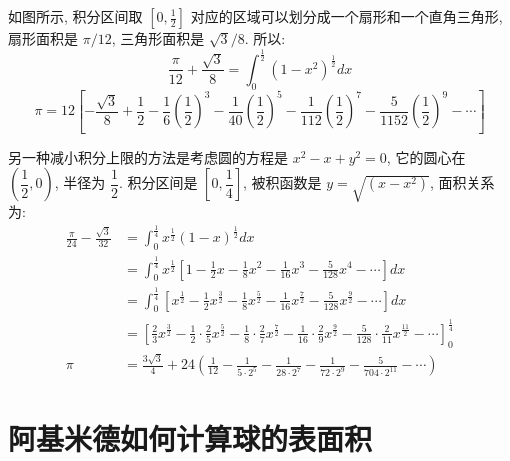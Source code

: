 如图所示, 积分区间取 $ [0, \frac{1}{2} ] $ 对应的区域可以划分成一个扇形和一个直角三角形, 扇形面积是 $ \pi/12 $, 三角形面积是 $ \sqrt{3}/8 $. 所以:
\[
\frac{\pi}{12}+\frac{\sqrt{3}}{8} = \int_0^\frac{1}{2}{(1-x^2)^\frac{1}{2} dx} 
\]
\[
\pi = 12\left[ -\frac{\sqrt{3}}{8} + \frac{1}{2}-\frac{1}{6}(\frac{1}{2})^3-\frac{1}{40}(\frac{1}{2})^5 - \frac{1}{112}(\frac{1}{2})^7 - \frac{5}{1152}(\frac{1}{2})^9 - \cdots \right]
\]

另一种减小积分上限的方法是考虑圆的方程是 $ x^2 - x + y^2 = 0 $, 它的圆心在 $ (\dfrac{1}{2}, 0) $, 半径为 $ \dfrac{1}{2} $. 积分区间是 $ [0,\dfrac{1}{4} ]$, 被积函数是 $ y = \sqrt{(x - x^2)} $, 面积关系为:
\begin{align*}
\frac{\pi}{24} - \frac{\sqrt{3}}{32} &= \int_0^\frac{1}{4}{x^\frac{1}{2}(1-x)^\frac{1}{2} dx} \\
		&= \int_0^\frac{1}{4}{ x^\frac{1}{2}\left[ 1-\frac{1}{2}x - \frac{1}{8}x^2-\frac{1}{16}x^3-\frac{5}{128}x^4-\cdots \right] dx} \\
		&= \int_0^\frac{1}{4}{ \left[ x^\frac{1}{2}-\frac{1}{2}x^\frac{3}{2}-\frac{1}{8}x^\frac{5}{2}-\frac{1}{16}x^\frac{7}{2}-\frac{5}{128}x^\frac{9}{2}-\cdots \right] dx} \\
		&= \left[ \frac{2}{3}x^\frac{3}{2} - \frac{1}{2}\cdot\frac{2}{5}x^\frac{5}{2}-\frac{1}{8}\cdot\frac{2}{7}x^\frac{7}{2}-\frac{1}{16}\cdot\frac{2}{9}x^\frac{9}{2}-\frac{5}{128}\cdot\frac{2}{11}x^\frac{11}{2} - \cdots \right]_0^\frac{1}{4} \\
\pi &= \frac{3\sqrt{3}}{4}+24\left(\frac{1}{12}-\frac{1}{5\cdot 2^5}-\frac{1}{28\cdot 2^7} -\frac{1}{72\cdot 2^9} - \frac{5}{704\cdot 2^{11}} -\cdots \right) 
\end{align*}


\newpage
\section{阿基米德如何计算球的表面积}

